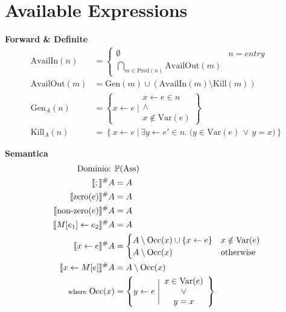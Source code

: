 \documentclass[a4paper,12pt,openany]{article}
\begin{document}
    \section*{Available Expressions}
    \textbf{Forward \& Definite}
    \begin{align*}
        \mbox{AvailIn}(n) &=
        \begin{cases}
            \emptyset & n = entry\\
            \bigcap\limits_{m\in \mbox{Pred}(n)} \mbox{AvailOut}(m)
        \end{cases}\\
        \mbox{AvailOut}(m) &= \mbox{Gen}(m) \cup (\mbox{AvailIn}(m) \setminus \mbox{Kill}(m))\\
        \mbox{Gen}_A(n) &= \left\{
            x \leftarrow e \;\Bigg\vert
            \begin{array}{cc}
                x \leftarrow e \in n\\
                \land\\
                x \notin \mbox{Var}(e)
            \end{array}
        \right\}\\
        \mbox{Kill}_A(n) &= \left\{
            x \leftarrow e \;\big\vert\, \exists y \leftarrow e' \in n.\; \big( y \in \mbox{Var}(e) \,\lor\, y=x \big)
        \right\}
    \end{align*}
    
    \textbf{Semantica}
    \begin{align*}
        \mbox{Dominio: }& \mathbb{P}(\mbox{Ass})\\
        \llbracket ; \rrbracket^\#A &= A\\
        \llbracket \mbox{zero}(e) \rrbracket^\#A &= A\\
        \llbracket \mbox{non-zero}(e) \rrbracket^\#A &= A\\
        \llbracket M[e_1]\leftarrow e_2 \rrbracket^\#A &= A\\
        \llbracket x \leftarrow e \rrbracket^\#A &=
        \begin{cases}
            A \setminus \mbox{Occ}(x) \cup \{x\leftarrow e\} & x\notin \mbox{Var}(e)\\
            A \setminus \mbox{Occ}(x) & \mbox{otherwise}
        \end{cases}\\
        \llbracket x\leftarrow M[e] \rrbracket^\#A &= A\setminus \mbox{Occ}(x)\\
        \mbox{{\footnotesize where} Occ}(x) &=
        \left\{
            y\leftarrow e \;\Bigg\vert
            \begin{array}{cc}
                x \in \mbox{Var}(e)\\
                \lor\\
                y=x
            \end{array}
        \right\}
    \end{align*}
    
\end{document}
